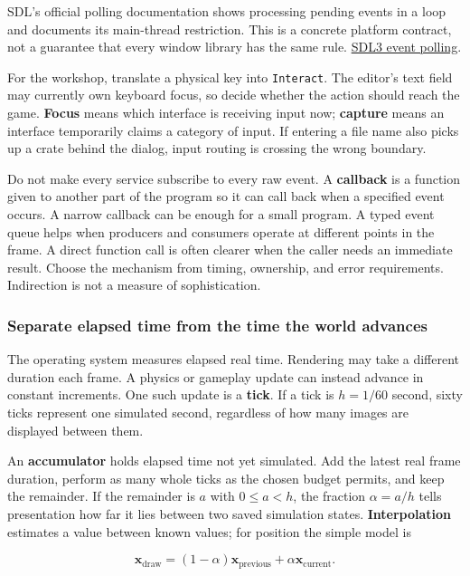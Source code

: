 SDL's official polling documentation shows processing pending events in a loop and documents its main-thread restriction. This is a concrete platform contract, not a guarantee that every window library has the same rule. \href{https://wiki.libsdl.org/SDL3/SDL_PollEvent}{SDL3 event polling}.

For the workshop, translate a physical key into \texttt{Interact}. The editor's text field may currently own keyboard focus, so decide whether the action should reach the game. \textbf{Focus} means which interface is receiving input now; \textbf{capture} means an interface temporarily claims a category of input. If entering a file name also picks up a crate behind the dialog, input routing is crossing the wrong boundary.

Do not make every service subscribe to every raw event. A \textbf{callback} is a function given to another part of the program so it can call back when a specified event occurs. A narrow callback can be enough for a small program. A typed event queue helps when producers and consumers operate at different points in the frame. A direct function call is often clearer when the caller needs an immediate result. Choose the mechanism from timing, ownership, and error requirements. Indirection is not a measure of sophistication.

\subsubsection{Separate elapsed time from the time the world advances}\label{separate-elapsed-time-from-the-time-the-world-advances}

The operating system measures elapsed real time. Rendering may take a different duration each frame. A physics or gameplay update can instead advance in constant increments. One such update is a \textbf{tick}. If a tick is \(h=1/60\) second, sixty ticks represent one simulated second, regardless of how many images are displayed between them.

An \textbf{accumulator} holds elapsed time not yet simulated. Add the latest real frame duration, perform as many whole ticks as the chosen budget permits, and keep the remainder. If the remainder is \(a\) with \(0\le a<h\), the fraction \(\alpha=a/h\) tells presentation how far it lies between two saved simulation states. \textbf{Interpolation} estimates a value between known values; for position the simple model is

\[
\mathbf{x}_{\mathrm{draw}}=(1-\alpha)\mathbf{x}_{\mathrm{previous}}+\alpha\mathbf{x}_{\mathrm{current}}.
\]

